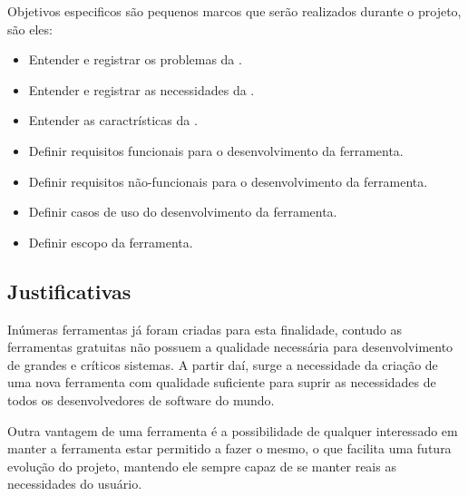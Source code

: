 Objetivos especificos são pequenos marcos que serão realizados durante o projeto, são eles:

\begin{itemize}
	\item Entender e registrar os problemas da \er.
	\item Entender e registrar as necessidades da \er.
	\item Entender as caractrísticas da \er.
	\item Definir requisitos funcionais para o desenvolvimento da ferramenta.
	\item Definir requisitos não-funcionais para o desenvolvimento da ferramenta.
	\item Definir casos de uso do desenvolvimento da ferramenta.
	\item Definir escopo da ferramenta.
\end{itemize}

\subsection{Justificativas} %
\label{sub:justificativas}

Inúmeras ferramentas já foram criadas para esta finalidade, contudo as ferramentas gratuitas não possuem a qualidade necessária para desenvolvimento de grandes e críticos sistemas. A partir daí, surge a necessidade da criação de uma nova ferramenta \opensource{} com qualidade suficiente para suprir as necessidades de todos os desenvolvedores de software do mundo.

Outra vantagem de uma ferramenta \opensource{} é a possibilidade de qualquer interessado em manter a ferramenta estar permitido a fazer o mesmo, o que facilita uma futura evolução do projeto, mantendo ele sempre capaz de se manter reais as necessidades do usuário.